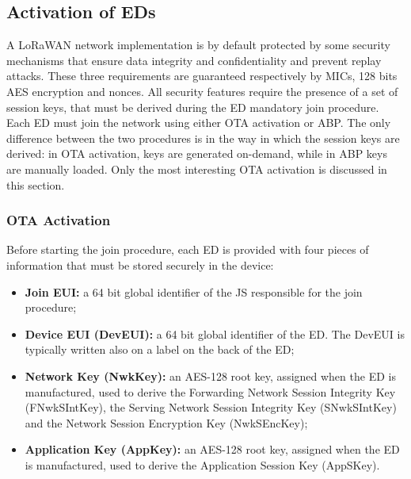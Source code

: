  



\subsection{Activation of \glspl{ED}}

A LoRaWAN network implementation is by default protected by some security mechanisms that ensure data integrity and confidentiality and prevent replay attacks. These three requirements are guaranteed respectively by \glspl{MIC}, 128 bits \gls{AES} encryption and nonces. All security features require the presence of a set of session keys, that must be derived during the \gls{ED} mandatory join procedure.
Each \gls{ED} must join the network using either \gls{OTA} activation or \gls{ABP}. The only difference between the two procedures is in the way in which the session keys are derived: in \gls{OTA} activation, keys are generated on-demand, while in \gls{ABP} keys are manually loaded. Only the most interesting \gls{OTA} activation is discussed in this section. \\

\subsubsection{OTA Activation} \label{sec:activation}

Before starting the join procedure, each \gls{ED} is provided with four pieces of information that must be stored securely in the device:

\begin{itemize}
	\item \textbf{Join EUI:} a 64 bit global identifier of the \gls{JS} responsible for the join procedure;
	\item \textbf{Device EUI (DevEUI):} a 64 bit global identifier of the \gls{ED}. The DevEUI is typically written also on a label on the back of the \gls{ED};
	\item \textbf{Network Key (NwkKey):} an AES-128 root key, assigned when the \gls{ED} is manufactured, used to derive the Forwarding Network Session Integrity Key (FNwkSIntKey), the Serving Network Session Integrity Key (SNwkSIntKey) and the Network Session Encryption Key (NwkSEncKey);
	\item \textbf{Application Key (AppKey):} an AES-128 root key, assigned when the \gls{ED} is manufactured, used to derive the Application Session Key (AppSKey).
\end{itemize}


